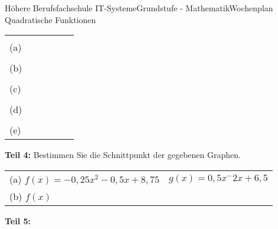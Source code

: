 \documentclass[oneside,openany,headings=optiontotoc,11pt,numbers=noenddot]{scrreprt}
\begin{document}
\begin{worksheet}{Höhere Berufsfachschule IT-Systeme}{Grundstufe - Mathematik}{Wochenplan Quadratische Funktionen}
\begin{framed}
\begin{tabularx}{\textwidth}{X|X|X|X|X|X}
				\hline
				\hline
				& & & & &\\
				(a) & & & & & \\
				\hline
				& & & & &\\
				(b) & & & & &\\
				\hline
				& & & & &\\
				(c) & & & & &\\
				\hline
				& & & & &\\
				(d)& & & & &\\
				\hline
				& & & & &\\
				(e) & & & & &\\
			\end{tabularx}
		\end{framed}
		\begin{framed}
			\noindent
			\textbf{Teil 4:} Bestimmen Sie die Schnittpunkt der gegebenen Graphen.\\
			\begin{tabularx}{\textwidth}{XX}
				(a) \(f(x) = -0,25x^2-0,5x+8,75\) & \(g(x) = 0,5x^- 2x +6,5\)\\
				(b) \(f(x) \)
			\end{tabularx}
		\end{framed}
		\begin{framed}
			\noindent
			\textbf{Teil 5:}
		\end{framed}
	\end{worksheet}
\end{document}
